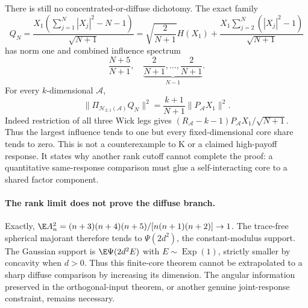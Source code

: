 There is still no concentrated-or-diffuse dichotomy. The exact family
\[
 Q_N=\frac{X_1(\sum_{j=1}^N|X_j|^2-N-1)}{\sqrt{N+1}}
 =\sqrt{\frac2{N+1}}H(X_1)
  +\frac{X_1\sum_{j=2}^N(|X_j|^2-1)}{\sqrt{N+1}}
\]
has norm one and combined influence spectrum
\[
 \frac{N+5}{N+1},\quad
 \underbrace{\frac2{N+1},\ldots,\frac2{N+1}}_{N-1}.
\]
For every $k$-dimensional $\mathcal A$,
\[
 \|\Pi_{\mathcal H_{2,1}(\mathcal A)}Q_N\|^2
 =\frac{k+1}{N+1}\|P_{\mathcal A}X_1\|^2.
\]
Indeed restriction of all three Wick legs gives
$(R_{\mathcal A}-k-1)P_{\mathcal A}X_1/\sqrt{N+1}$.
Thus the largest influence tends to one but every fixed-dimensional
core share tends to zero. This is not a counterexample to K or a
claimed high-payoff response. It states why another rank cutoff
cannot complete the proof: a quantitative same-response comparison
must glue a self-interacting core to a shared factor component.


\paragraph{The rank limit does not prove the diffuse branch.}
Exactly,
$\E A_n^2=(n+3)(n+4)(n+5)/[n(n+1)(n+2)]\to1$.
The trace-free spherical majorant therefore tends to
$\Psi(2d^2)$, the constant-modulus support. The Gaussian support is
$\E\Psi(2d^2E)$ with $E\sim\operatorname{Exp}(1)$, strictly smaller
by concavity when $d>0$. Thus this finite-core theorem cannot be
extrapolated to a sharp diffuse comparison by increasing its dimension.
The angular information preserved in the orthogonal-input theorem,
or another genuine joint-response constraint, remains necessary.
